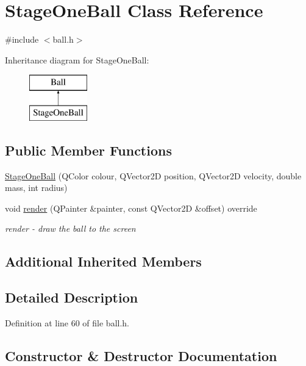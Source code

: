 \hypertarget{class_stage_one_ball}{}\section{Stage\+One\+Ball Class Reference}
\label{class_stage_one_ball}


{\ttfamily \#include $<$ball.\+h$>$}

Inheritance diagram for Stage\+One\+Ball\+:\begin{figure}[H]
\begin{center}
\leavevmode
\includegraphics[height=2.000000cm]{class_stage_one_ball}
\end{center}
\end{figure}
\subsection*{Public Member Functions}
\begin{DoxyCompactItemize}
\item 
\mbox{\hyperlink{class_stage_one_ball_a70fd661f3b92f3e4745d4963b9b3ec80}{Stage\+One\+Ball}} (Q\+Color colour, Q\+Vector2D position, Q\+Vector2D velocity, double mass, int radius)
\item 
void \mbox{\hyperlink{class_stage_one_ball_aa4f7f52cb8946b59c201d724dc0dc5bd}{render}} (Q\+Painter \&painter, const Q\+Vector2D \&offset) override
\begin{DoxyCompactList}\small\item\em render -\/ draw the ball to the screen \end{DoxyCompactList}\end{DoxyCompactItemize}
\subsection*{Additional Inherited Members}


\subsection{Detailed Description}


Definition at line 60 of file ball.\+h.



\subsection{Constructor \& Destructor Documentation}
\mbox{\label{class_stage_one_ball_a70fd661f3b92f3e4745d4963b9b3ec80}} 
